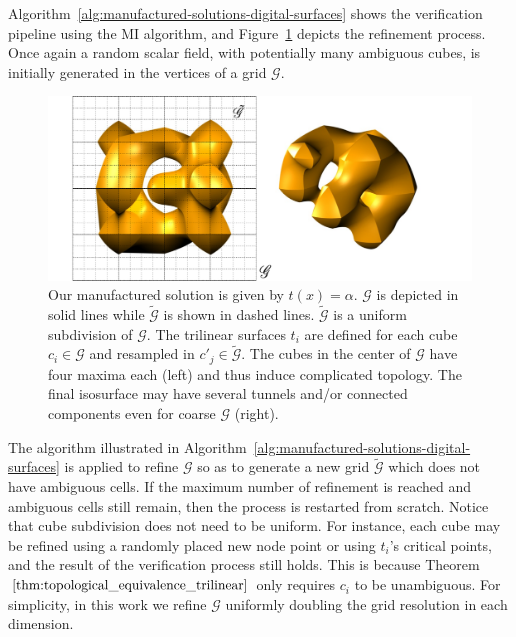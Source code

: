 Algorithm~\ref{alg:manufactured-solutions-digital-surfaces} shows the
verification pipeline using the MI algorithm, and
Figure~\ref{fig:trilinear-field} depicts the refinement process. Once
again a random scalar field, with potentially many ambiguous cubes, is
initially generated in the vertices of a grid $\mathcal{G}$.  
\begin{figure}[b]
\centering
\includegraphics[width=0.7\linewidth,keepaspectratio=true]
{chapter3/figures/trilinear-field.pdf}
\caption{\label{fig:trilinear-field}Our manufactured solution is given by $t(x) = \alpha$. $\mathcal{G}$ is
depicted in solid lines while $\tilde{\mathcal{G}}$ is shown in dashed lines.
$\tilde{\mathcal{G}}$ is a uniform subdivision of $\mathcal{G}$. The trilinear
surfaces $t_i$ are defined for each cube
$c_i \in \mathcal{G}$ and resampled in $c'_j \in \tilde{\mathcal{G}}$.
The cubes in the center of $\mathcal{G}$ have four maxima each
(left) and thus induce complicated topology. The final
isosurface may have several tunnels and/or connected
components even for coarse $\mathcal{G}$ (right). }
\end{figure}
The
algorithm illustrated in Algorithm~\ref{alg:manufactured-solutions-digital-surfaces} is applied to
refine $\mathcal{G}$ so as to generate a new grid
$\tilde{\mathcal{G}}$ which does not have ambiguous cells. If the
maximum number of refinement is reached and ambiguous cells still
remain, then the process is restarted from scratch.  Notice that cube
subdivision does not need to be uniform.  For instance, each cube may
be refined using a randomly placed new node point or using $t_i$'s
critical points, and the result of the verification process still
holds.  This is because Theorem
$\ref{thm:topological_equivalence_trilinear}$ only requires $c_i$ to
be unambiguous.
For simplicity, in this work we refine $\mathcal{G}$ uniformly
doubling the grid resolution in each dimension.

